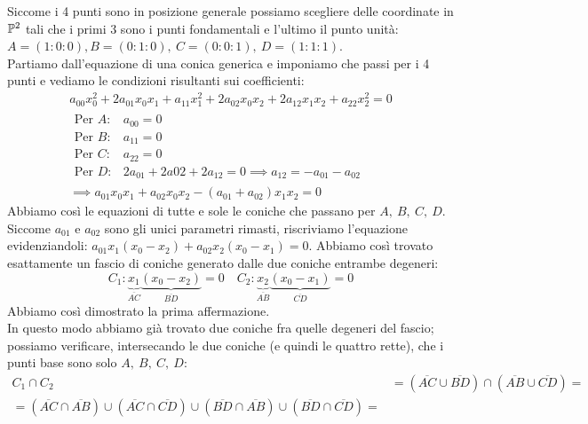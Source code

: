 \begin{demonstration}
	Siccome i 4 punti sono in posizione generale possiamo scegliere delle coordinate in $\proj[2]{\ }$ tali che i primi 3 sono i punti fondamentali e l'ultimo il punto unità: $A=(1\colon0\colon0), B=(0\colon1\colon0),\ C=(0\colon0\colon1),\ D=(1\colon1\colon1)$.\\
	Partiamo dall'equazione di una conica generica e imponiamo che passi per i 4 punti e vediamo le condizioni risultanti sui coefficienti:
		\begin{gather*}
			a_{00}x_0^2+2a_{01}x_0x_1+a_{11}x_1^2+2a_{02}x_0x_2+2a_{12}x_1x_2+a_{22}x_2^2=0\\
			\begin{array}{ll}
				\text{Per } A \colon & a_{00}=0 \\
				\text{Per } B \colon & a_{11}=0 \\
				\text{Per } C \colon & a_{22}=0 \\
				\text{Per } D \colon & 2a_{01}+2a{02}+2a_{12}=0 \implies a_{12}=-a_{01}-a_{02}
			\end{array}\\
			\implies a_{01}x_0x_1+a_{02}x_0x_2-(a_{01}+a_{02})x_1x_2=0
		\end{gather*}
	Abbiamo così le equazioni di tutte e sole le coniche che passano per $A,\ B,\ C,\ D$. Siccome $a_{01}$ e $a_{02}$ sono gli unici parametri rimasti, riscriviamo l'equazione evidenziandoli: $a_{01}x_1(x_0-x_2)+a_{02}x_2(x_0-x_1)=0$. Abbiamo così trovato esattamente un fascio di coniche generato dalle due coniche entrambe degeneri:
		\begin{equation*}
			C_1\colon \underbrace{x_1}_{\overline{AC}} \underbrace{(x_0-x_2)}_{\overline{BD}}=0 \quad
			C_2\colon \underbrace{x_2}_{\overline{AB}} \underbrace{(x_0-x_1)}_{\overline{CD}}=0
		\end{equation*}
	Abbiamo così dimostrato la prima affermazione.\\
	In questo modo abbiamo già trovato due coniche fra quelle degeneri del fascio; possiamo verificare, intersecando le due coniche (e quindi le quattro rette), che i punti base sono solo $A,\ B,\ C,\ D$:
		\begin{equation*}
			\begin{array}{ll}
				C_1\cap C_2  & = (\overline{AC}\cup \overline{BD}) \cap (\overline{AB}\cup\overline{CD}) =\\ =(\overline{AC}\cap\overline{AB}) \cup (\overline{AC}\cap\overline{CD}) \cup (\overline{BD}\cap \overline{AB}) \cup (\overline{BD}\cap \overline{CD})=\\ 

\end{array}
\end{equation*}
\end{demonstration}

